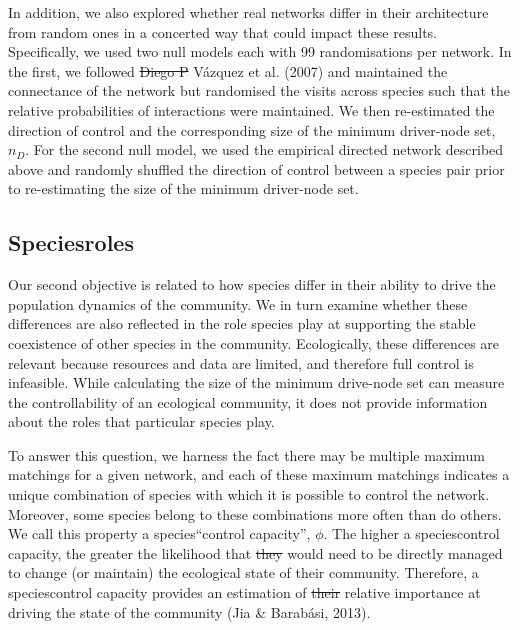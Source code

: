 \documentclass[a4paper]{artikel1}
\theoremstyle{definition}
\theoremstyle{definition}
\theoremstyle{definition}
\theoremstyle{remark}
\providecommand{\DIFaddtex}[1]{{\protect\color{blue}\uwave{#1}}} %
\providecommand{\DIFdeltex}[1]{{\protect\color{red}\sout{#1}}}                      %
\providecommand{\DIFaddbegin}{} %
\providecommand{\DIFaddend}{} %
\providecommand{\DIFdelbegin}{} %
\providecommand{\DIFdelend}{} %
\providecommand{\DIFadd}[1]{\texorpdfstring{\DIFaddtex{#1}}{#1}} %
\providecommand{\DIFdel}[1]{\texorpdfstring{\DIFdeltex{#1}}{}} %
\begin{document}
In addition, we also explored whether real networks differ in their
architecture from random ones in a concerted way that could impact these
results. Specifically, we used two null models each with 99
randomisations per network. In the first, we followed \DIFdelbegin \DIFdel{Diego P }\DIFdelend Vázquez et al.
(2007) and maintained the connectance of the network but randomised the
visits across species such that the relative probabilities of
interactions were maintained. We then re-estimated the direction of
control and the corresponding size of the minimum driver-node set,
\(n_D\). For the second null model, we used the empirical directed
network described above and randomly shuffled the direction of control
between a species pair prior to re-estimating the size of the minimum
driver-node set.

\subsection{Species\DIFaddbegin \DIFadd{' }\DIFaddend roles}\label{species-roles}

Our second objective is related to how species differ in their ability
to drive the population dynamics of the community. We in turn examine
whether these differences are also reflected in the role species play at
supporting the stable coexistence of other species in the community.
Ecologically, these differences are relevant because resources and data
are limited, and therefore full control is infeasible. While calculating
the size of the minimum drive-node set can measure the controllability
of an ecological community, it does not provide information about the
roles that particular species play.

To answer this question, we harness the fact there may be multiple
maximum matchings for a given network, and each of these maximum
matchings indicates a unique combination of species with which it is
possible to control the network. Moreover, some species belong to these
combinations more often than do others. We call this property a species\DIFaddbegin \DIFadd{'
}\DIFaddend ``control capacity'', \(\phi\). The higher a species\DIFaddbegin \DIFadd{' }\DIFaddend control capacity,
the greater the likelihood that \DIFdelbegin \DIFdel{they }\DIFdelend \DIFaddbegin \DIFadd{it }\DIFaddend would need to be directly managed to
change (or maintain) the ecological state of their community. Therefore,
a species\DIFaddbegin \DIFadd{' }\DIFaddend control capacity provides an estimation of \DIFdelbegin \DIFdel{their
}\DIFdelend \DIFaddbegin \DIFadd{its }\DIFaddend relative
importance at driving the state of the community (Jia \& Barabási,
2013).
\end{document}

